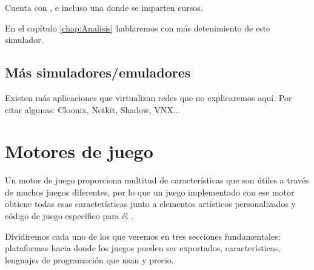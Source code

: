 Cuenta con ,  e incluso una  donde se imparten cursos.  

En el capítulo \ref{chap:Analisis} hablaremos con más detenimiento de este simulador.

\subsection{Más simuladores/emuladores}
Existen más aplicaciones que virtualizan redes que no explicaremos aquí. Por citar algunas: Cloonix, Netkit, Shadow, VNX... \cite{netsimulators}


\section{Motores de juego}
Un motor de juego proporciona multitud de características que son útiles a través de muchos juegos diferentes, por lo que un juego implementado con ese motor obtiene todas esas características junto a elementos artísticos personalizados y código de juego específico para él \cite{unityinaction}. 

Dividiremos cada uno de los que veremos en tres secciones fundamentales: plataformas hacia donde los juegos pueden ser exportados, características, lenguajes de programación que usan y precio.

